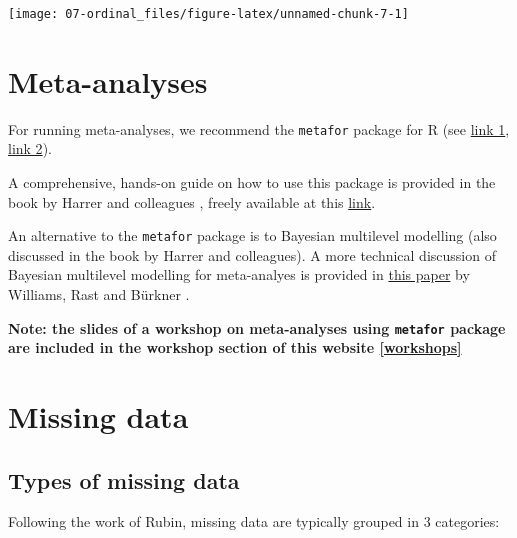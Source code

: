\documentclass[
]{book}
\begin{document}
\begin{center}\texttt{[image: 07-ordinal\_files/figure-latex/unnamed-chunk-7-1]} \end{center}

\chapter{Meta-analyses}\label{meta-analysis}

For running meta-analyses, we recommend the \texttt{metafor} package for R (see \href{https://www.metafor-project.org/doku.php}{link 1}, \href{https://wviechtb.github.io/metafor/}{link 2}).

A comprehensive, hands-on guide on how to use this package is provided in the book by Harrer and colleagues \citep{harrer2021doing}, freely available at this \href{https://bookdown.org/MathiasHarrer/Doing_Meta_Analysis_in_R/}{link}.

An alternative to the \texttt{metafor} package is to Bayesian multilevel modelling (also discussed in the book by Harrer and colleagues). A more technical discussion of Bayesian multilevel modelling for meta-analyes is provided in \href{https://psyarxiv.com/7tbrm/}{this paper} by Williams, Rast and Bürkner \citep{williams_rast_bürkner_2018}.

\textbf{Note: the slides of a workshop on meta-analyses using \texttt{metafor} package are included in the workshop section of this website \ref{workshops}}

\chapter{Missing data}\label{missing-data}

\section{Types of missing data}\label{types-of-missing-data}

Following the work of Rubin\citep{rubin76}, missing data are typically grouped in 3 categories:
\end{document}

